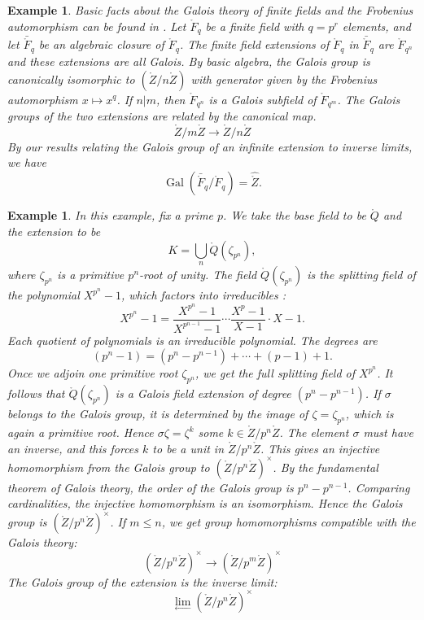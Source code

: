 \documentclass{amsart}
\newtheorem{example}[exercise]{Example}
\def\op#1{{\operatorname{#1}}}
\def\oG{\op{Gal}}
\begin{document}
\begin{example}  
Basic facts about the Galois theory of finite fields and the Frobenius
automorphism can be found in
\cite[Chapter~IX,Prop.~9.40]{knapp-basic}.
Let $\ring{F}_q$ be a finite field with $q=p^r$ elements, and
let $\bar{\ring{F}}_q$ be an algebraic closure of $\ring{F}_q$.
The finite field extensions of $\ring{F}_q$ in $\bar{\ring{F}}_q$
are $\ring{F}_{q^n}$ and these extensions are all Galois.  
By basic algebra, the Galois group is
canonically isomorphic to $(\ring{Z}/n\ring{Z})$ with generator given by the
Frobenius automorphism $x\mapsto x^q$.  If $n|m$, then $\ring{F}_{q^n}$ is a Galois subfield
of $\ring{F}_{q^m}$.   The Galois groups of the two extensions are related by
the canonical map.
\[
\ring{Z}/m\ring{Z} \to \ring{Z}/n\ring{Z}
\]
By our results relating the Galois group of an infinite extension to inverse limits, we
have
\[
\oG(\bar{\ring{F}}_q/\ring{F}_q) = \hat{\ring{Z}}.
\]
\end{example}

\begin{example} In this example, fix a prime $p$.
We take the base field to be $\ring{Q}$ and
the extension to be 
\[
K=\bigcup_n \ring{Q}(\zeta_{p^n}),
\]
where $\zeta_{p^n}$ is a primitive $p^n$-root of unity.
The field $\ring{Q}(\zeta_{p^n})$ is the splitting field of the polynomial $X^{p^n}-1$,
which factors into irreducibles \cite[Lemma~9.42]{knapp-basic}:
\[
X^{p^n}-1 = \frac{X^{p^n}-1}{X^{p^{n-1}}-1}\cdots \frac{X^p-1}{X-1} \cdot {X-1}.
\]
Each quotient of polynomials is an irreducible polynomial.  The degrees are
\[
(p^n-1) = (p^n-p^{n-1}) + \cdots + (p-1) + 1.
\]
Once we adjoin one primitive root $\zeta_{p^n}$, we get the full
splitting field of $X^{p^n}$.  It follows that $\ring{Q}(\zeta_{p^n})$
is a Galois field extension of degree $(p^n-p^{n-1})$.  If $\sigma$
belongs to the Galois group, it is determined by the image of
$\zeta=\zeta_{p^n}$, which is again a primitive root.  Hence
$\sigma\zeta = \zeta^k$ some $k\in\ring{Z}/p^n\ring{Z}$.  The element
$\sigma$ must have an inverse, and this forces $k$ to be a unit in
$\ring{Z}/p^n\ring{Z}$.  This gives an injective homomorphism from the
Galois group to $(\ring{Z}/p^n\ring{Z})^\times$.  By the fundamental
theorem of Galois theory, the order of the Galois group is $p^n
-p^{n-1}$. Comparing cardinalities, the injective homomorphism is an
isomorphism.  Hence the Galois group is
$(\ring{Z}/p^n\ring{Z})^\times$.  If $m\le n$, we get group
homomorphisms compatible with the Galois theory:
\[
(\ring{Z}/p^n\ring{Z})^\times \to (\ring{Z}/p^m\ring{Z})^\times
\]
The Galois group of the extension is the inverse limit:
\[
\lim_{\leftarrow} (\ring{Z}/p^n\ring{Z})^\times
\]
\end{example}
\end{document}
